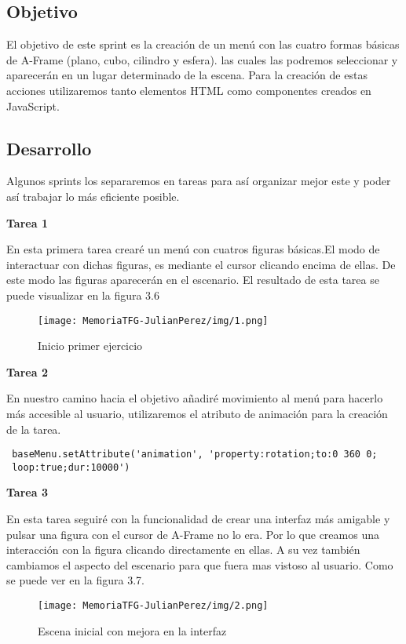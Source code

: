 \documentclass[a4paper, 12pt]{book}
\begin{document}
\subsection{Objetivo}
El objetivo de este sprint es la creación de un menú con las cuatro formas básicas de A-Frame (plano, cubo, cilindro y esfera). las cuales las podremos seleccionar y aparecerán en un lugar determinado de la escena. Para la creación de estas acciones utilizaremos tanto elementos HTML como componentes creados en JavaScript.

\subsection{Desarrollo}
Algunos sprints los separaremos en tareas para así organizar mejor este y poder así trabajar lo más eficiente posible.

\textbf{Tarea 1}

En esta primera tarea crearé un menú con cuatros figuras básicas.El modo de interactuar con dichas figuras, es  mediante el cursor clicando encima de ellas. De este modo las figuras aparecerán en el escenario.
El resultado de esta tarea se puede visualizar en la figura 3.6
\begin{figure}[H]
  \centering
  \texttt{[image: MemoriaTFG-JulianPerez/img/1.png]}
  \caption{Inicio primer ejercicio}\label{scrum}
\end{figure}

\textbf{Tarea 2}

En nuestro camino hacia el objetivo añadiré movimiento al menú para hacerlo más accesible al usuario, utilizaremos el atributo  de animación para la creación de la tarea.
\begin{verbatim}
 baseMenu.setAttribute('animation', 'property:rotation;to:0 360 0;
 loop:true;dur:10000')   
\end{verbatim}

\textbf{Tarea 3}

En esta tarea seguiré con la funcionalidad de crear una interfaz más amigable y pulsar una figura con el cursor de A-Frame no lo era. Por lo que creamos una interacción con la figura clicando directamente en ellas. A su vez también cambiamos el aspecto del escenario para que fuera mas vistoso al usuario. Como se puede ver en la figura 3.7.
         \begin{figure}[H]
  \centering
  \texttt{[image: MemoriaTFG-JulianPerez/img/2.png]}
  \caption{Escena inicial con mejora en la interfaz}\label{scrum}
\end{figure}
\end{document}
